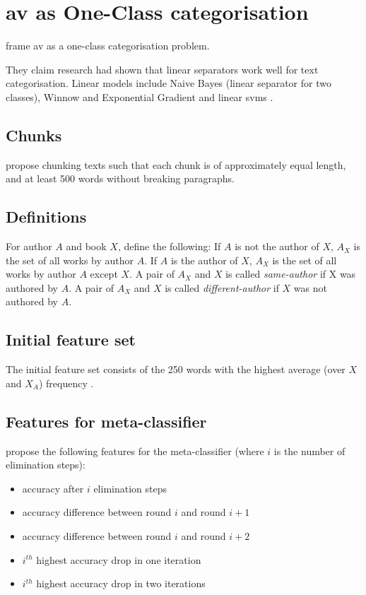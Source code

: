 \section{\ac{av} as One-Class categorisation}
\label{sec:av_one_class}





\citet{koppel_authorship_2004} frame \ac{av} as a one-class categorisation problem.

They claim research had shown that linear separators work well for text categorisation.
Linear models include Naive Bayes (linear separator for two classes), 
Winnow and Exponential Gradient and linear \acp{svm} \citep{koppel_authorship_2004}. 


\subsection{Chunks}
\citet{koppel_authorship_2004} propose chunking texts such that each chunk is of approximately equal length, 
and at least 500 words without breaking paragraphs. 

\subsection{Definitions}
For author $A$ and book $X$, \citet{koppel_authorship_2004} define the following:
If $A$ is not the author of $X$, $A_X$ is the set of all works by author $A$.
If $A$ is the author of $X$, $A_X$ is the set of all works by author $A$ except $X$.
A pair of $A_X$ and $X$ is called \emph{same-author} if X was authored by $A$.
A pair of $A_X$ and $X$ is called \emph{different-author} if $X$ was not authored by $A$.

\subsection{Initial feature set}
The initial feature set consists of the 250 words with the highest average (over $X$ and $X_A$) frequency \citep{koppel_authorship_2004}.

\subsection{Features for meta-classifier}
\citet{koppel_authorship_2004} propose the following features for the meta-classifier 
(where $i$ is the number of elimination steps):
\begin{itemize}
    \item accuracy after $i$ elimination steps
    \item accuracy difference between round $i$ and round $i+1$
    \item accuracy difference between round $i$ and round $i+2$
    \item $i^{th}$ highest accuracy drop in one iteration
    \item $i^{th}$ highest accuracy drop in two iterations
\end{itemize}

